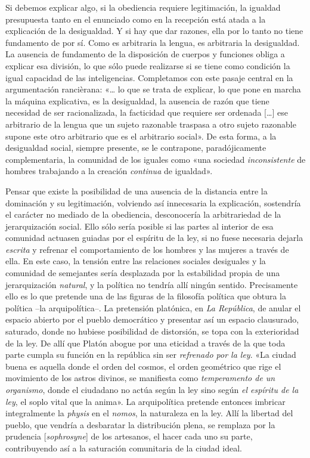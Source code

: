 Si debemos explicar algo, si la obediencia requiere legitimación, la igualdad presupuesta tanto en el enunciado como en la recepción está atada a la explicación de la desigualdad. Y si hay que dar razones, ella por lo tanto no tiene fundamento de por sí. Como es arbitraria la lengua, es arbitraria la desigualdad. La ausencia de fundamento de la disposición de cuerpos y funciones obliga a explicar esa división, lo que sólo puede realizarse si se tiene como condición la igual capacidad de las inteligencias. Completamos con este pasaje central en la argumentación rancièrana: «\ldots{} lo que se trata de explicar, lo que pone en marcha la máquina explicativa, es la desigualdad, la ausencia de razón que tiene necesidad de ser racionalizada, la facticidad que requiere ser ordenada {[}\ldots{]} ese arbitrario de la lengua que un sujeto razonable traspasa a otro sujeto razonable supone este otro arbitrario que es el arbitrario social». De esta forma, a la desigualdad social, siempre presente, se le contrapone, paradójicamente complementaria, la comunidad de los iguales como «una sociedad \emph{inconsistente} de hombres trabajando a la creación \emph{continua} de igualdad».

Pensar que existe la posibilidad de una ausencia de la distancia entre la dominación y su legitimación, volviendo así innecesaria la explicación, sostendría el carácter no mediado de la obediencia, desconocería la arbitrariedad de la jerarquización social. Ello sólo sería posible si las partes al interior de esa comunidad actuasen guiadas por el espíritu de la ley, si no fuese necesaria dejarla \emph{escrita} y refrenar el comportamiento de los hombres y las mujeres a través de ella. En este caso, la tensión entre las relaciones sociales desiguales y la comunidad de semejantes sería desplazada por la estabilidad propia de una jerarquización \emph{natural}, y la política no tendría allí ningún sentido. Precisamente ello es lo que pretende una de las figuras de la filosofía política que obtura la política --la arquipolítica--. La pretensión platónica, en \emph{La República}, de anular el espacio abierto por el pueblo democrático y presentar así un espacio clausurado, saturado, donde no hubiese posibilidad de distorsión, se topa con la exterioridad de la ley. De allí que Platón abogue por una eticidad a través de la que toda parte cumpla su función en la república sin ser \emph{refrenado por la ley}. «La ciudad buena es aquella donde el orden del cosmos, el orden geométrico que rige el movimiento de los astros divinos, se manifiesta como \emph{temperamento de un organismo}, donde el ciudadano no actúa según la ley sino según \emph{el espíritu de la ley}, el soplo vital que la anima». La arquipolítica pretende entonces imbricar integralmente la \emph{physis} en el \emph{nomos}, la naturaleza en la ley. Allí la libertad del pueblo, que vendría a desbaratar la distribución plena, se remplaza por la prudencia {[}\emph{sophrosyne}{]} de los artesanos, el hacer cada uno su parte, contribuyendo así a la saturación comunitaria de la ciudad ideal.

